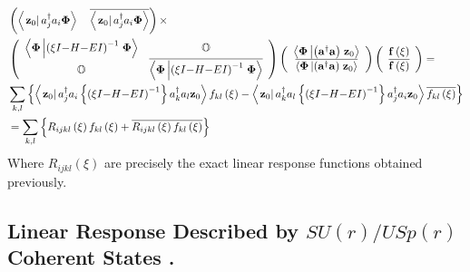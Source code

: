 \documentclass[aps,preprint]{revtex4}%
\begin{document}
\begin{align}
&  \left(  \left\langle \left.  {\mathbf{z}_{0}}\right\vert a_{j}^{\dag}%
a_{i}\mathbf{\Phi}\right\rangle \quad\overline{\left\langle \left.
{\mathbf{z}_{0}}\right\vert a_{j}^{\dag}a_{i}\mathbf{\Phi}\right\rangle
}\right)  \times\\
&  \left(
\begin{array}
[c]{cc}%
\left\langle \mathbf{\Phi}\left\vert \left(  \xi I\mathbb{-}H\mathbf{-}%
EI\right)  ^{-1}\right.  \mathbf{\Phi}\right\rangle  & \mathbb{O}\\
\mathbb{O} & \overline{\left\langle \mathbf{\Phi}\left\vert \left(  \xi
I\mathbb{-}H\mathbf{-}EI\right)  ^{-1}\right.  \mathbf{\Phi}\right\rangle }%
\end{array}
\right)  \left(
\begin{array}
[c]{c}%
\left\langle \mathbf{\Phi}\left\vert \left(  \mathbf{a}^{\dagger}%
\mathbf{a}\right)  \right.  {\mathbf{z}_{0}}\right\rangle \\
\overline{\left\langle \mathbf{\Phi}\left\vert \left(  \mathbf{a}^{\dagger
}\mathbf{a}\right)  \right.  {\mathbf{z}_{0}}\right\rangle }%
\end{array}
\right)  \left(
\begin{array}
[c]{c}%
\mathbf{f}\left(  \xi\right) \\
\overline{\mathbf{f}\left(  \xi\right)  }%
\end{array}
\right)  =\\
&  \sum_{k,l}\left\{  \left\langle \left.  {\mathbf{z}_{0}}\right\vert
a_{j}^{\dag}a_{i}\left\{  \left(  \xi I\mathbb{-}H\mathbf{-}EI\right)
^{-1}\right\}  a_{k}^{\dag}a_{l}{\mathbf{z}_{0}}\right\rangle f_{kl}\left(
\xi\right)  -\left\langle \left.  {\mathbf{z}_{0}}\right\vert a_{k}^{\dag
}a_{l}\left\{  \left(  \xi I\mathbb{-}H\mathbf{-}EI\right)  ^{-1}\right\}
a_{j}^{\dag}a_{i}{\mathbf{z}_{0}}\right\rangle \overline{f_{kl}\left(
\xi\right)  }\right\} \\
&  =\sum_{k,l}\left\{  R_{ijkl}\left(  \xi\right)  f_{kl}\left(  \xi\right)
+\overline{R_{ijkl}\left(  \xi\right)  f_{kl}\left(  \xi\right)  }\right\}
\end{align}
Where $R_{ijkl}\left(  \xi\right)  $ are precisely the exact linear response
functions obtained previously.

\subsection{Linear Response Described by $SU\left(  r\right)  /USp\left(
r\right)  $ Coherent States .}
\end{document}

